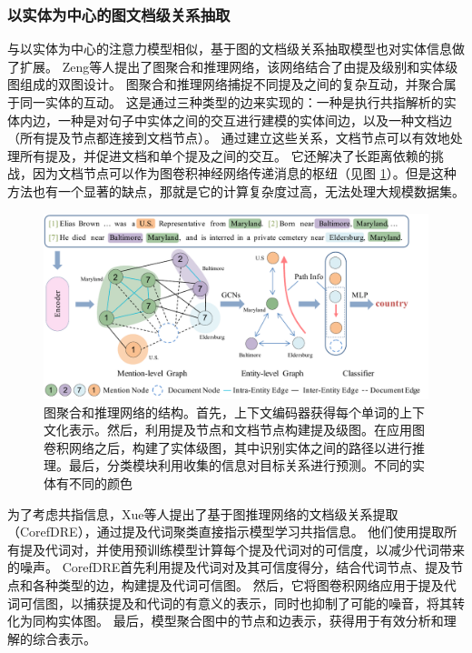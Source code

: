 \documentclass[bachelor]{thesis-uestc}
\begin{document}
\subsubsection{以实体为中心的图文档级关系抽取}\label{subsec:entity-centric-graph}

与以实体为中心的注意力模型相似，基于图的文档级关系抽取模型也对实体信息做了扩展。
Zeng等人提出了图聚合和推理网络，该网络结合了由提及级别和实体级图组成的双图设计。
图聚合和推理网络捕捉不同提及之间的复杂互动，并聚合属于同一实体的互动。
这是通过三种类型的边来实现的：一种是执行共指解析的实体内边，一种是对句子中实体之间的交互进行建模的实体间边，以及一种文档边（所有提及节点都连接到文档节点）。
通过建立这些关系，文档节点可以有效地处理所有提及，并促进文档和单个提及之间的交互。
它还解决了长距离依赖的挑战，因为文档节点可以作为图卷积神经网络传递消息的枢纽（见图 \ref{fig_GAIN}）。但是这种方法也有一个显著的缺点，那就是它的计算复杂度过高，无法处理大规模数据集。\par

\begin{figure}
    \centering
    \includegraphics[width=0.8\linewidth]{misc/model.pdf}
    \caption{图聚合和推理网络的结构。首先，上下文编码器获得每个单词的上下文化表示。然后，利用提及节点和文档节点构建提及级图。在应用图卷积网络之后，构建了实体级图，其中识别实体之间的路径以进行推理。最后，分类模块利用收集的信息对目标关系进行预测。不同的实体有不同的颜色}
    \label{fig_GAIN}
\end{figure}

为了考虑共指信息，Xue等人提出了基于图推理网络的文档级关系提取（CorefDRE），通过提及代词聚类直接指示模型学习共指信息。
他们使用提取所有提及代词对，并使用预训练模型计算每个提及代词对的可信度，以减少代词带来的噪声。
CorefDRE首先利用提及代词对及其可信度得分，结合代词节点、提及节点和各种类型的边，构建提及代词可信图。
然后，它将图卷积网络应用于提及代词可信图，以捕获提及和代词的有意义的表示，同时也抑制了可能的噪音，将其转化为同构实体图。
最后，模型聚合图中的节点和边表示，获得用于有效分析和理解的综合表示。\par
\end{document}
